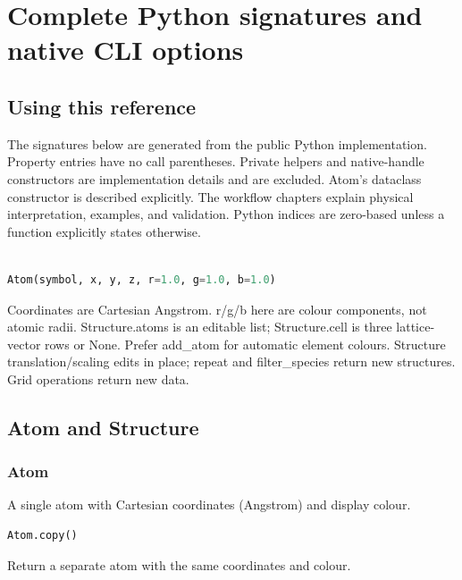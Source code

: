 \chapter{Complete Python signatures and native CLI options}\label{ch:api-signatures}

\section{Using this reference}

The signatures below are generated from the public Python implementation. Property entries have no call parentheses. Private helpers and native-handle constructors are implementation details and are excluded. Atom's dataclass constructor is described explicitly. The workflow chapters explain physical interpretation, examples, and validation. Python indices are zero-based unless a function explicitly states otherwise.

\begin{lstlisting}[language=Python]

Atom(symbol, x, y, z, r=1.0, g=1.0, b=1.0)

\end{lstlisting}

Coordinates are Cartesian Angstrom. r/\allowbreak{}g/\allowbreak{}b here are colour components, not atomic radii. Structure.atoms is an editable list; Structure.cell is three lattice-vector rows or None. Prefer add\_\allowbreak{}atom for automatic element colours. Structure translation/\allowbreak{}scaling edits in place; repeat and filter\_\allowbreak{}species return new structures. Grid operations return new data.

\section{Atom and Structure}

\subsection{Atom}

A single atom with Cartesian coordinates (Angstrom) and display colour.

\begin{samepage}

\begin{lstlisting}[language=Python]
Atom.copy()
\end{lstlisting}

Return a separate atom with the same coordinates and colour.

\end{samepage}



